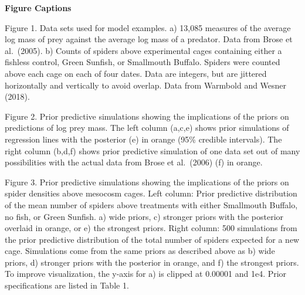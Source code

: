 \documentclass[
  12pt,
]{article}
\begin{document}
\newpage

\textbf{Figure Captions}

Figure 1. Data sets used for model examples. a) 13,085 measures of the
average log mass of prey against the average log mass of a predator.
Data from Brose et al.~(2005). b) Counts of spiders above experimental
cages containing either a fishless control, Green Sunfish, or Smallmouth
Buffalo. Spiders were counted above each cage on each of four dates.
Data are integers, but are jittered horizontally and vertically to avoid
overlap. Data from Warmbold and Wesner (2018).

Figure 2. Prior predictive simulations showing the implications of the
priors on predictions of log prey mass. The left column (a,c,e) shows
prior simulations of regression lines with the posterior (e) in orange
(95\% credible intervals). The right column (b,d,f) shows prior
predictive simulation of one data set out of many possibilities with the
actual data from Brose et al.~(2006) (f) in orange.

Figure 3. Prior predictive simulations showing the implications of the
priors on spider densities above mesocosm cages. Left column: Prior
predictive distribution of the mean number of spiders above treatments
with either Smallmouth Buffalo, no fish, or Green Sunfish. a) wide
priors, c) stronger priors with the posterior overlaid in orange, or e)
the strongest priors. Right column: 500 simulations from the prior
predictive distribution of the total number of spiders expected for a
new cage. Simulations come from the same priors as described above as b)
wide priors, d) stronger priors with the posterior in orange, and f) the
strongest priors. To improve visualization, the y-axis for a) is clipped
at 0.00001 and 1e4. Prior specifications are listed in Table 1.
\end{document}
